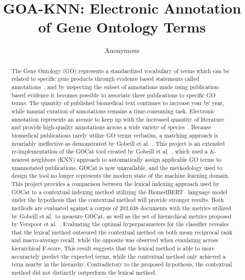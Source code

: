 \documentclass[11pt]{article}
\title{GOA-KNN\@: Electronic Annotation of Gene Ontology Terms}
\author{Anonymous}
\theoremstyle{plain}
\theoremstyle{definition}
\begin{document}
\maketitle

\declaration{}

\begin{abstract}
    The Gene Ontology (GO) represents a standardized vocabulary of terms which can be related to specific gene products through evidence based statements called annotations~\cite{go/2026/introduction}, and by inspecting the subset of annotations made using publication-based evidence it becomes possible to associate these publications to specific GO terms. The quantity of published biomedical text continues to increase year by year, while manual curation of annotations remains a time-consuming task. Electronic annotation represents an avenue to keep up with the increased quantity of literature and provide high-quality annotations across a wide variety of species~\cite{huntley/2014/database}. Because biomedical publications rarely utilize GO terms verbatim, a matching approach is invariably ineffective as demonstrated by Gobeill et al.\ \cite{gobeill/2013/managing}. This project is an extended re-implementation of the GOCat tool created by Gobeill et al.\ \cite{gobeill/2013/managing}, which used a $K$-nearest neighbors (KNN) approach to automatically assign applicable GO terms to unannotated publications. GOCat is now unavailable, and the methodology used to design the tool no longer represents the modern state of the machine learning domain. This project provides a comparison between the lexical indexing approach used by GOCat to a contextual indexing method utilizing the BiomedBERT~\cite{gu/2021/domainspecific} language model under the hypothesis that the contextual method will provide stronger results. Both methods are evaluated against a corpus of 202,638 documents with the metrics utilized by Gobeill et al.\ to measure GOCat, as well as the set of hierarchical metrics proposed by Verspoor et al.~\cite{verspoor/2006/categorization}. Evaluating the optimal hyperparameters for the classifier reveales that the lexical method outscored the contextual method on both mean reciprocal rank and macro-average recall, while the opposite was observed when evaulating across hierarchical F-score. This result suggests that the lexical method is able to more accuractely predict the expected terms, while the contextual method only achieved a term nearby in the hierarchy. Contradictory to the proposed hypothesis, the contextual method did not distinctly outperform the lexical method.
\end{abstract}
\end{document}
